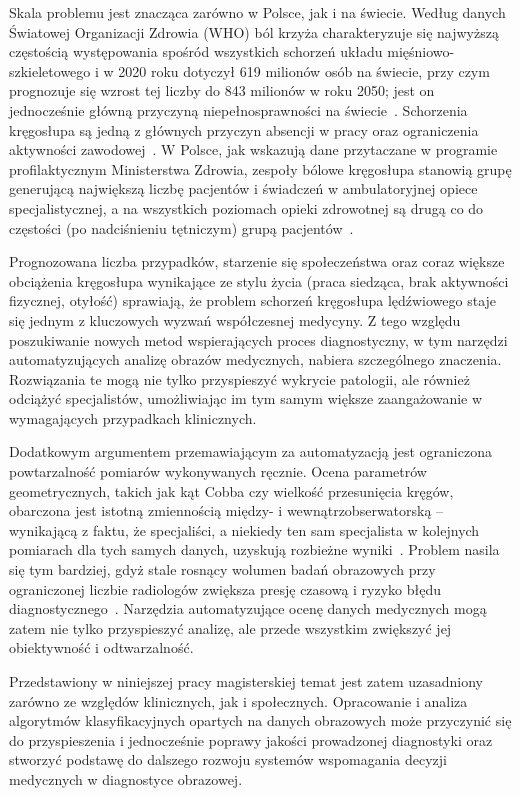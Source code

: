 Skala problemu jest znacząca zarówno w Polsce, jak i na świecie.
Według danych Światowej Organizacji Zdrowia (WHO) ból krzyża charakteryzuje się najwyższą częstością występowania spośród wszystkich schorzeń układu mięśniowo-szkieletowego i w 2020 roku dotyczył 619 milionów osób na świecie, przy czym prognozuje się wzrost tej liczby do 843 milionów w roku 2050; jest on jednocześnie główną przyczyną niepełnosprawności na świecie~\cite{who_lbp}.
Schorzenia kręgosłupa są jedną z głównych przyczyn absencji w pracy oraz ograniczenia aktywności zawodowej~\cite{lefik}.
W Polsce, jak wskazują dane przytaczane w programie profilaktycznym Ministerstwa Zdrowia, zespoły bólowe kręgosłupa stanowią grupę generującą największą liczbę pacjentów i świadczeń w ambulatoryjnej opiece specjalistycznej, a na wszystkich poziomach opieki zdrowotnej są drugą co do częstości (po nadciśnieniu tętniczym)  grupą pacjentów~\cite{mz_kregoslup}.

Prognozowana liczba przypadków, starzenie się społeczeństwa oraz coraz większe obciążenia kręgosłupa wynikające ze stylu życia (praca siedząca, brak aktywności fizycznej, otyłość) sprawiają, że problem schorzeń kręgosłupa lędźwiowego staje się jednym z kluczowych wyzwań współczesnej medycyny.
Z tego względu poszukiwanie nowych metod wspierających proces diagnostyczny, w tym narzędzi automatyzujących analizę obrazów medycznych, nabiera szczególnego znaczenia.
Rozwiązania te mogą nie tylko przyspieszyć wykrycie patologii, ale również odciążyć specjalistów, umożliwiając im tym samym większe zaangażowanie w wymagających przypadkach klinicznych.

Dodatkowym argumentem przemawiającym za automatyzacją jest ograniczona powtarzalność pomiarów wykonywanych ręcznie.
Ocena parametrów geometrycznych, takich jak kąt Cobba czy wielkość przesunięcia kręgów, obarczona jest istotną zmiennością między- i wewnątrzobserwatorską -- wynikającą z faktu, że  specjaliści, a niekiedy ten sam specjalista w kolejnych pomiarach dla tych samych danych, uzyskują rozbieżne wyniki~\cite{gstoettner, tallroth}.
Problem nasila się tym bardziej, gdyż stale rosnący wolumen badań obrazowych przy ograniczonej liczbie radiologów zwiększa presję czasową i ryzyko błędu diagnostycznego~\cite{kasalak}.
Narzędzia automatyzujące ocenę danych medycznych mogą zatem nie tylko przyspieszyć analizę, ale przede wszystkim zwiększyć jej obiektywność i odtwarzalność.


Przedstawiony w niniejszej pracy magisterskiej temat jest zatem uzasadniony zarówno ze względów klinicznych, jak i społecznych.
Opracowanie i analiza algorytmów klasyfikacyjnych opartych na danych obrazowych może przyczynić się do przyspieszenia i jednocześnie poprawy jakości prowadzonej diagnostyki oraz stworzyć podstawę do dalszego rozwoju systemów wspomagania decyzji medycznych w diagnostyce obrazowej.

